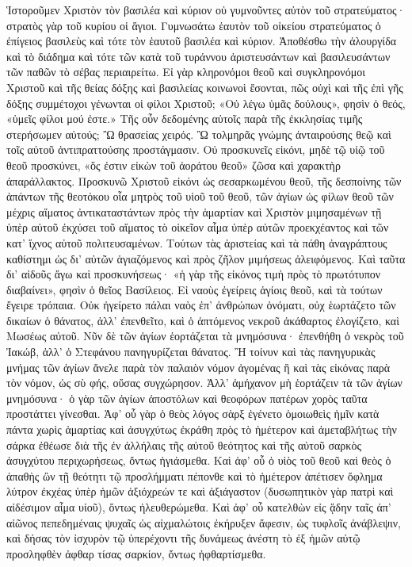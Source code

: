 \documentclass[10pt]{book}
\begin{document}
\begin{paracol}{2}
Ἱστοροῦμεν Χριστὸν τὸν βασιλέα καὶ κύριον οὐ γυμνοῦντες αὐτὸν τοῦ στρατεύματος· στρατὸς γὰρ τοῦ κυρίου οἱ ἅγιοι. Γυμνωσάτω ἑαυτὸν τοῦ οἰκείου στρατεύματος ὁ ἐπίγειος βασιλεὺς καὶ τότε τὸν ἑαυτοῦ βασιλέα καὶ κύριον.
Ἀποθέσθω τὴν ἁλουργίδα καὶ τὸ διάδημα καὶ τότε τῶν κατὰ τοῦ τυράννου ἀριστευσάντων καὶ βασιλευσάντων τῶν παθῶν τὸ σέβας περιαιρείτω.
Εἰ γὰρ κληρονόμοι θεοῦ καὶ συγκληρονόμοι Χριστοῦ καὶ τῆς θείας δόξης καὶ βασιλείας κοινωνοὶ ἔσονται, πῶς οὐχὶ καὶ τῆς ἐπὶ γῆς δόξης συμμέτοχοι γένωνται οἱ φίλοι Χριστοῦ; «Οὐ λέγω ὑμᾶς δούλους», φησὶν ὁ θεός, «ὑμεῖς φίλοι μού ἐστε.» Τῆς οὖν δεδομένης αὐτοῖς παρὰ τῆς ἐκκλησίας τιμῆς στερήσωμεν αὐτούς; Ὢ θρασείας χειρός.
Ὢ τολμηρᾶς γνώμης ἀνταιρούσης θεῷ καὶ τοῖς αὐτοῦ ἀντιπραττούσης προστάγμασιν. Οὐ προσκυνεῖς εἰκόνι, μηδὲ τῷ υἱῷ τοῦ θεοῦ προσκύνει, «ὅς ἐστιν εἰκὼν τοῦ ἀοράτου θεοῦ» ζῶσα καὶ χαρακτὴρ ἀπαράλλακτος.
Προσκυνῶ Χριστοῦ εἰκόνι ὡς σεσαρκωμένου θεοῦ, τῆς δεσποίνης τῶν ἁπάντων τῆς θεοτόκου οἷα μητρὸς τοῦ υἱοῦ τοῦ θεοῦ, τῶν ἁγίων ὡς φίλων θεοῦ τῶν μέχρις αἵματος ἀντικαταστάντων πρὸς τὴν ἁμαρτίαν καὶ Χριστὸν μιμησαμένων τῇ ὑπὲρ αὐτοῦ ἐκχύσει τοῦ αἵματος τὸ οἰκεῖον αἷμα ὑπὲρ αὐτῶν προεκχέαντος καὶ τῶν κατ’ ἴχνος αὐτοῦ πολιτευσαμένων.
Τούτων τὰς ἀριστείας καὶ τὰ πάθη ἀναγράπτους καθίστημι ὡς δι’ αὐτῶν ἁγιαζόμενος καὶ πρὸς ζῆλον μιμήσεως ἀλειφόμενος.
Καὶ ταῦτα δι’ αἰδοῦς ἄγω καὶ προσκυνήσεως· «ἡ γὰρ τῆς εἰκόνος τιμὴ πρὸς τὸ πρωτότυπον διαβαίνει», φησὶν ὁ θεῖος Βασίλειος.
Εἰ ναοὺς ἐγείρεις ἁγίοις θεοῦ, καὶ τὰ τούτων ἔγειρε τρόπαια.
Οὐκ ἠγείρετο πάλαι ναὸς ἐπ’ ἀνθρώπων ὀνόματι, οὐχ ἑωρτάζετο τῶν δικαίων ὁ θάνατος, ἀλλ’ ἐπενθεῖτο, καὶ ὁ ἁπτόμενος νεκροῦ ἀκάθαρτος ἐλογίζετο, καὶ Μωσέως αὐτοῦ.
Νῦν δὲ τῶν ἁγίων ἑορτάζεται τὰ μνημόσυνα· ἐπενθήθη ὁ νεκρὸς τοῦ Ἰακώβ, ἀλλ’ ὁ Στεφάνου πανηγυρίζεται θάνατος.
Ἢ τοίνυν καὶ τὰς πανηγυρικὰς μνήμας τῶν ἁγίων ἄνελε παρὰ τὸν παλαιὸν νόμον ἀγομένας ἢ καὶ τὰς εἰκόνας παρὰ τὸν νόμον, ὡς σὺ φής, οὔσας συγχώρησον.
Ἀλλ’ ἀμήχανον μὴ ἑορτάζειν τὰ τῶν ἁγίων μνημόσυνα· ὁ γὰρ τῶν ἁγίων ἀποστόλων καὶ θεοφόρων πατέρων χορὸς ταῦτα προστάττει γίνεσθαι.
Ἀφ’ οὗ γὰρ ὁ θεὸς λόγος σὰρξ ἐγένετο ὁμοιωθεὶς ἡμῖν κατὰ πάντα χωρὶς ἁμαρτίας καὶ ἀσυγχύτως ἐκράθη πρὸς τὸ ἡμέτερον καὶ ἀμεταβλήτως τὴν σάρκα ἐθέωσε διὰ τῆς ἐν ἀλλήλαις τῆς αὐτοῦ θεότητος καὶ τῆς αὐτοῦ σαρκὸς ἀσυγχύτου περιχωρήσεως, ὄντως ἡγιάσμεθα.
Καὶ ἀφ’ οὗ ὁ υἱὸς τοῦ θεοῦ καὶ θεὸς ὁ ἀπαθὴς ὢν τῇ θεότητι τῷ προσλήμματι πέπονθε καὶ τὸ ἡμέτερον ἀπέτισεν ὄφλημα λύτρον ἐκχέας ὑπὲρ ἡμῶν ἀξιόχρεών τε καὶ ἀξιάγαστον (δυσωπητικὸν γὰρ πατρὶ καὶ αἰδέσιμον αἷμα υἱοῦ), ὄντως ἠλευθερώμεθα.
Καὶ ἀφ’ οὗ κατελθὼν εἰς ᾅδην ταῖς ἀπ’ αἰῶνος πεπεδημέναις ψυχαῖς ὡς αἰχμαλώτοις ἐκήρυξεν ἄφεσιν, ὡς τυφλοῖς ἀνάβλεψιν, καὶ δήσας τὸν ἰσχυρὸν τῷ ὑπερέχοντι τῆς δυνάμεως ἀνέστη τὸ ἐξ ἡμῶν αὐτῷ προσληφθὲν ἀφθαρ τίσας σαρκίον, ὄντως ἠφθαρτίσμεθα.

\end{paracol}
\end{document}
